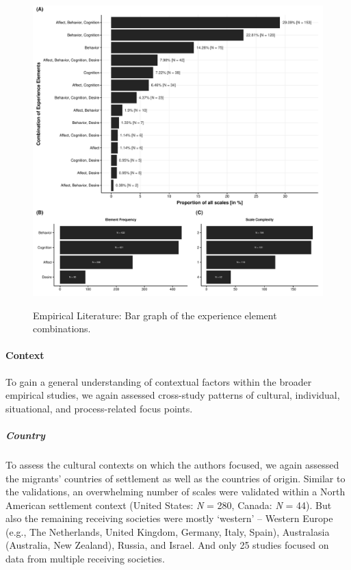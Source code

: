 \begin{figure}[h]
\centering
\caption{Empirical Literature: Bar graph of the experience element combinations.}
\includegraphics[width=\textwidth]{Figures/EmpPlotFreq-1}
\label{fig:EmpPlotFreq-1}
\end{figure}



\paragraph{Context}

To gain a general understanding of contextual factors within the broader
empirical studies, we again assessed cross-study patterns of cultural,
individual, situational, and process-related focus points.

\subparagraph{Country}

To assess the cultural contexts on which the authors focused, we again
assessed the migrants' countries of settlement as well as the countries
of origin. Similar to the validations, an overwhelming number of scales
were validated within a North American settlement context (United
States: \textit{N} = 280, Canada: \textit{N} = 44). But also the
remaining receiving societies were mostly `western' -- Western Europe
(e.g., The Netherlands, United Kingdom, Germany, Italy, Spain),
Australasia (Australia, New Zealand), Russia, and Israel. And only 25
studies focused on data from multiple receiving societies.

